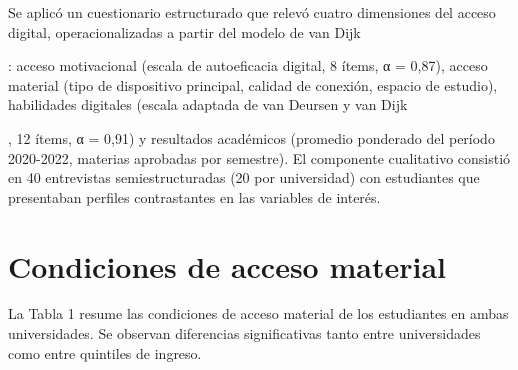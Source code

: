     
    Se aplicó un cuestionario estructurado que relevó cuatro dimensiones del acceso digital, operacionalizadas a partir del modelo de van Dijk 
    
    \autocite{2553-VANDIJK2020}
    
     : acceso motivacional (escala de autoeficacia digital, 8 ítems, α = 0,87), acceso material (tipo de dispositivo principal, calidad de conexión, espacio de estudio), habilidades digitales (escala adaptada de van Deursen y van Dijk 
    
    \autocite{2557-VANDEURSEN2019}
    
     , 12 ítems, α = 0,91) y resultados académicos (promedio ponderado del período 2020-2022, materias aprobadas por semestre). El componente cualitativo consistió en 40 entrevistas semiestructuradas (20 por universidad) con estudiantes que presentaban perfiles contrastantes en las variables de interés.
   
   


\section{Condiciones de acceso material}

    
    La Tabla 1 resume las condiciones de acceso material de los estudiantes en ambas universidades. Se observan diferencias significativas tanto entre universidades como entre quintiles de ingreso.
   
   


